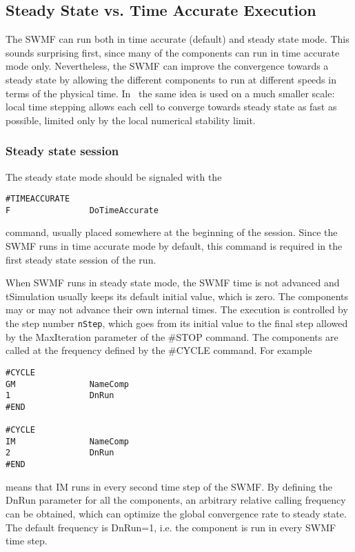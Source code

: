 \subsection{Steady State vs. Time Accurate Execution}

The SWMF can run both in time accurate (default) and
steady state mode. This sounds surprising first, 
since many of the components can run in time accurate 
mode only. Nevertheless, the SWMF can improve the convergence
towards a steady state by allowing the different components
to run at different speeds in terms of the physical time.
In \BATSRUS\ the same idea is used on a much smaller scale:
local time stepping allows each cell to converge towards
steady state as fast as possible, limited only by the local
numerical stability limit.

\subsubsection{Steady state session}

The steady state mode should be signaled with the 
\begin{verbatim}
#TIMEACCURATE
F                DoTimeAccurate
\end{verbatim}
command, usually placed somewhere at the beginning of the session.
Since the SWMF runs in time accurate mode by default,
this command is required in the first steady state session of the run.

When SWMF runs in steady state mode, the SWMF time is not
advanced and tSimulation usually keeps its default initial value,
which is zero. 
The components may or may not advance their own
internal times. The execution is controlled by the 
step number {\tt nStep}, which goes from its initial value 
to the final step allowed by the MaxIteration parameter
of the \#STOP command. The components are called at
the frequency defined by the \#CYCLE command. For example
\begin{verbatim}
#CYCLE
GM               NameComp
1                DnRun
#END

#CYCLE
IM               NameComp
2                DnRun
#END
\end{verbatim}
means that IM runs in every second time step of the SWMF.
By defining the DnRun parameter for all the components,
an arbitrary relative calling frequency can be obtained,
which can optimize the global convergence rate to steady state.
The default frequency is DnRun=1, i.e. the component is
run in every SWMF time step. 

